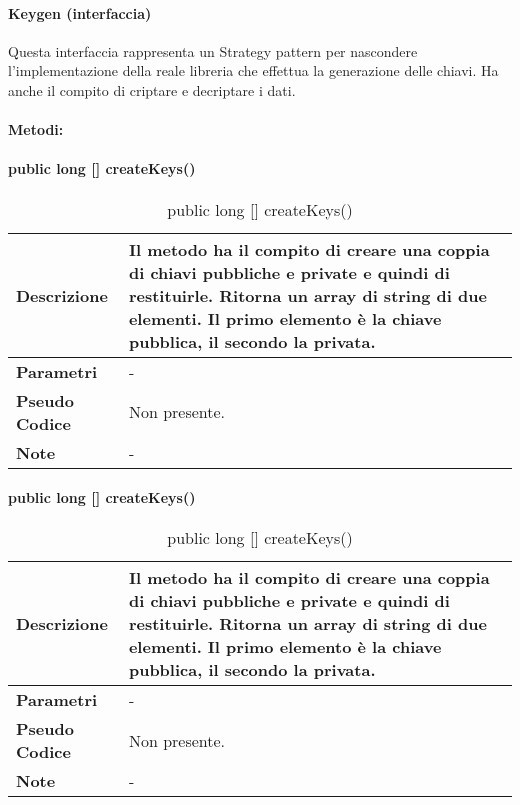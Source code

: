 \paragraph{Keygen (interfaccia)}
Questa interfaccia rappresenta un Strategy pattern per nascondere l’implementazione della reale libreria che effettua la generazione delle chiavi. Ha anche il compito di criptare e decriptare i dati.
\paragraph{Metodi:}
\paragraph{public long [] createKeys()}
\begin{center}
    \begin{longtable}{|p{3cm}|p{9cm}|}%
    \caption{public long [] createKeys()}
    \endfirsthead
    \endhead
    \hline
    \textbf{Descrizione} & Il metodo ha il compito di creare una coppia di chiavi pubbliche e private e quindi di restituirle. Ritorna un array di string di due elementi. Il primo elemento è la chiave pubblica, il secondo la privata.\\
    \hline
    \textbf{Parametri} &      
    -
    \\
    \hline
    \textbf{Pseudo Codice} & 
    Non presente.
    \\
    \hline
    \textbf{Note} & 
    -
    \\
    \hline
    \end{longtable}
    \end{center}



\paragraph{public long [] createKeys()}
\begin{center}
    \begin{longtable}{|p{3cm}|p{9cm}|}%
    \caption{public long [] createKeys()}
    \endfirsthead
    \endhead
    \hline
    \textbf{Descrizione} & Il metodo ha il compito di creare una coppia di chiavi pubbliche e private e quindi di restituirle. Ritorna un array di string di due elementi. Il primo elemento è la chiave pubblica, il secondo la privata.\\
    \hline
    \textbf{Parametri} &      
    -
    \\
    \hline
    \textbf{Pseudo Codice} & 
    Non presente.
    \\
    \hline
    \textbf{Note} & 
    -
    \\
    \hline
    \end{longtable}
    \end{center}



